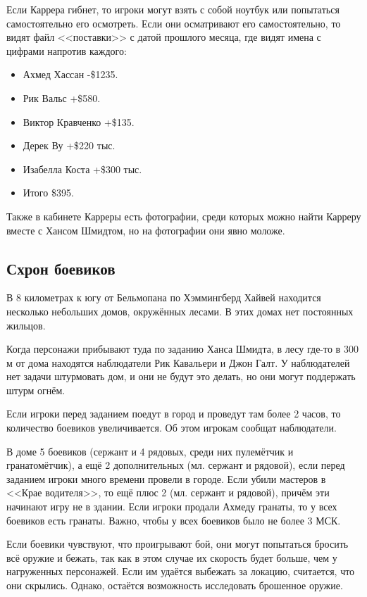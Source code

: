 \documentclass{article}
\begin{document}
Если Каррера гибнет, то игроки могут взять с собой ноутбук или
попытаться самостоятельно его осмотреть. Если они осматривают его
самостоятельно, то видят файл <<поставки>> с датой прошлого месяца, где
видят имена с цифрами напротив каждого:

\begin{itemize}
\item
  Ахмед Хассан -\$1235.
\item
  Рик Вальс +\$580.
\item
  Виктор Кравченко +\$135.
\item
  Дерек Ву +\$220 тыс.
\item
  Изабелла Коста +\$300 тыс.
\item
  Итого \$395.
\end{itemize}

Также в кабинете Карреры есть фотографии, среди которых можно найти
Карреру вместе с Хансом Шмидтом, но на фотографии они явно моложе.

\subsection{Схрон
боевиков}\label{militant-hideout}

В 8 километрах к югу от Бельмопана по Хэммингберд Хайвей находится
несколько небольших домов, окружённых лесами. В этих домах нет
постоянных жильцов.

Когда персонажи прибывают туда по заданию Ханса Шмидта, в лесу где-то в
300 м от дома находятся наблюдатели Рик Кавальери и Джон Галт. У
наблюдателей нет задачи штурмовать дом, и они не будут это делать, но
они могут поддержать штурм огнём.

Если игроки перед заданием поедут в город и проведут там более 2 часов,
то количество боевиков увеличивается. Об этом игрокам сообщат
наблюдатели.

В доме 5 боевиков (сержант и 4 рядовых, среди них пулемётчик и
гранатомётчик), а ещё 2 дополнительных (мл. сержант и рядовой), если
перед заданием игроки много времени провели в городе. Если убили
мастеров в <<Крае водителя>>, то ещё плюс 2 (мл. сержант и рядовой),
причём эти начинают игру не в здании. Если игроки продали Ахмеду
гранаты, то у всех боевиков есть гранаты. Важно, чтобы у всех боевиков
было не более 3 МСК.

Если боевики чувствуют, что проигрывают бой, они могут попытаться
бросить всё оружие и бежать, так как в этом случае их скорость будет
больше, чем у нагруженных персонажей. Если им удаётся выбежать за
локацию, считается, что они скрылись. Однако, остаётся возможность
исследовать брошенное оружие.
\end{document}
